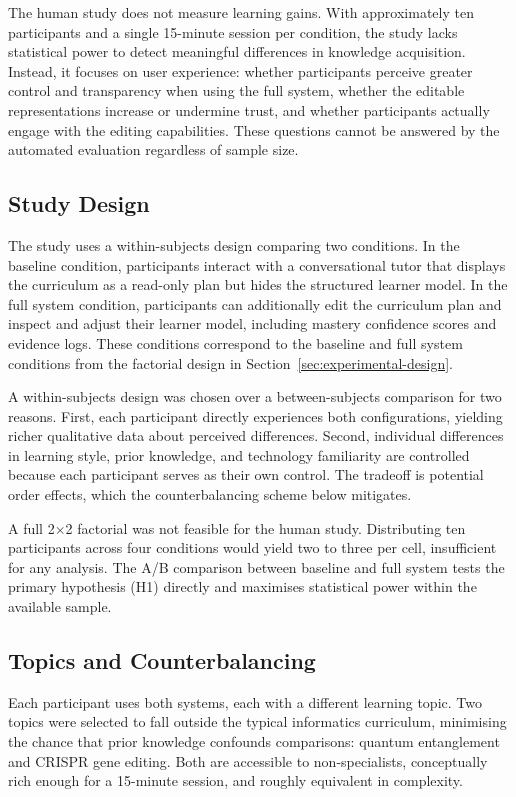 \documentclass[logo,bsc,singlespacing,parskip,online]{infthesis}
\begin{document}
The human study does not measure learning gains. With approximately ten participants and a single 15-minute session per condition, the study lacks statistical power to detect meaningful differences in knowledge acquisition. Instead, it focuses on user experience: whether participants perceive greater control and transparency when using the full system, whether the editable representations increase or undermine trust, and whether participants actually engage with the editing capabilities. These questions cannot be answered by the automated evaluation regardless of sample size.

\subsection{Study Design}

The study uses a within-subjects design comparing two conditions. In the baseline condition, participants interact with a conversational tutor that displays the curriculum as a read-only plan but hides the structured learner model. In the full system condition, participants can additionally edit the curriculum plan and inspect and adjust their learner model, including mastery confidence scores and evidence logs. These conditions correspond to the baseline and full system conditions from the factorial design in Section~\ref{sec:experimental-design}.

A within-subjects design was chosen over a between-subjects comparison for two reasons. First, each participant directly experiences both configurations, yielding richer qualitative data about perceived differences. Second, individual differences in learning style, prior knowledge, and technology familiarity are controlled because each participant serves as their own control. The tradeoff is potential order effects, which the counterbalancing scheme below mitigates.

A full 2$\times$2 factorial was not feasible for the human study. Distributing ten participants across four conditions would yield two to three per cell, insufficient for any analysis. The A/B comparison between baseline and full system tests the primary hypothesis (H1) directly and maximises statistical power within the available sample.

\subsection{Topics and Counterbalancing}

Each participant uses both systems, each with a different learning topic. Two topics were selected to fall outside the typical informatics curriculum, minimising the chance that prior knowledge confounds comparisons: quantum entanglement and CRISPR gene editing. Both are accessible to non-specialists, conceptually rich enough for a 15-minute session, and roughly equivalent in complexity.
\end{document}
